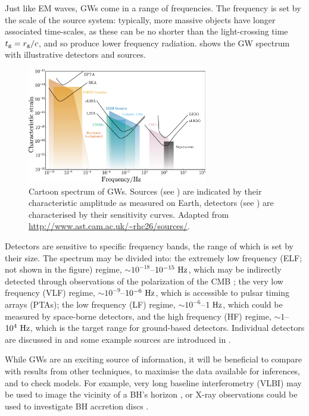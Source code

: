 Just like EM waves, GWs come in a range of frequencies. The frequency is set by the scale of the source system: typically, more massive objects have longer associated time-scales, as these can be no shorter than the light-crossing time $t_\mathrm{g} = r_\mathrm{g}/c$, and so produce lower frequency radiation.  shows the GW spectrum with illustrative detectors and sources. 
\begin{figure}
  \centering
  \includegraphics[width=0.7\textwidth]{./images/GW_spectrum}
    \caption{Cartoon spectrum of GWs. Sources (see ) are indicated by their characteristic amplitude as measured on Earth, detectors (see ) are characterised by their sensitivity curves. Adapted from \url{http://www.ast.cam.ac.uk/~rhc26/sources/}.}   
    \label{fig:spectrum} 
\end{figure}
Detectors are sensitive to specific frequency bands, the range of which is set by their size. The spectrum may be divided into: the extremely low frequency (ELF; not shown in the figure) regime, $\sim10^{-18}$--$10^{-15}~\mathrm{Hz}$, which may be indirectly detected through observations of the polarization of the CMB \citep[e.g.,][]{Hu1997,Kamionkowski1997}; the very low frequency (VLF) regime, $\sim10^{-9}$--$10^{-6}~\mathrm{Hz}$, which is accessible to pulsar timing arrays (PTAs); the low frequency (LF) regime, $\sim10^{-6}$--$1~\mathrm{Hz}$, which could be measured by space-borne detectors, and the high frequency (HF) regime, $\sim1$--$10^4~\mathrm{Hz}$, which is the target range for ground-based detectors. Individual detectors are discussed in  and some example sources are introduced in .

While GWs are an exciting source of information, it will be beneficial to compare with results from other techniques, to maximise the data available for inferences, and to check models. For example, very long baseline interferometry (VLBI) may be used to image the vicinity of a BH's horizon \citep{Doeleman2008,Johannsen2012a}, or X-ray observations could be used to investigate BH accretion discs \citep{Psaltis2008}.

